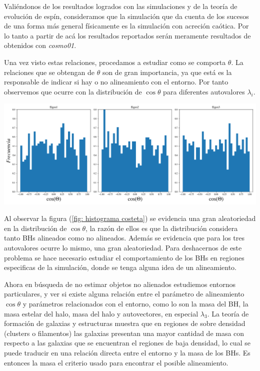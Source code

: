 Valiéndonos de los resultados logrados con las simulaciones y de la teoría de evolución de espín, consideramos que la simulación que da cuenta de los sucesos de una forma más general físicamente es la simulación con acreción caótica. Por lo tanto a partir de acá los resultados reportados serán meramente resultados de obtenidos con {\it{cosmo01}}. 




Una vez visto estas relaciones, procedamos a estudiar como se comporta $\theta$. La relaciones que se obtengan de $\theta$ son de gran importancia, ya que está es la responsable de indicar si hay o no alineamiento con el entorno. Por tanto observemos que ocurre con la distribución de $\cos \theta$ para diferentes autovalores $\lambda_{i}$.
%
\begin{center}
\includegraphics[scale=.35]{./figures/6_Resultados/cosmo01/histograma_cos_theta.png}
\label{fig: histograma costeta}
\end{center}
%
Al observar la figura (\ref{fig: histograma costeta}) se evidencia una gran aleatoriedad en la distribución de $\cos\theta$, la razón de ellos es que la distribución considera tanto BHs alineados como no alineados. Además se evidencia que para los tres autovalores ocurre lo mismo, una gran aleatoriedad. Para deshacernos de este problema se hace necesario estudiar el comportamiento de los BHs en regiones especificas de la simulación, donde se tenga alguna idea de un alineamiento.  

Ahora en búsqueda de no estimar objetos no alienados estudiemos entornos particulares, y ver si existe alguna relación entre el parámetro de alineamiento $\cos\theta$ y parámetros relacionados con el entorno, como lo son la masa del BH, la masa estelar del halo, masa del halo y autovectores, en especial $\lambda_{3}$. La teoría de formación de galaxias y estructuras muestra que en regiones de sobre densidad (clusters o filamentos) las galaxias presentan una mayor cantidad de masa  con respecto a las galaxias que se encuentran el regiones de baja densidad, lo cual se puede traducir en una relación directa entre el entorno y la masa de los BHs. Es entonces la masa el criterio usado para encontrar el posible alineamiento. 

